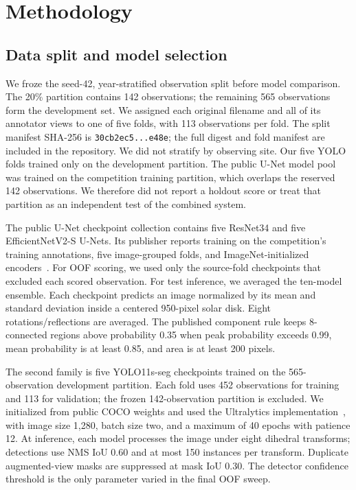 \documentclass[sigconf]{acmart}
\begin{document}
\section{Methodology}\label{sec:methodology}
    \subsection{Data split and model selection}
We froze the seed-42, year-stratified observation split before model comparison. The 20\% partition contains 142 observations; the remaining 565 observations form the development set. We assigned each original filename and all of its annotator views to one of five folds, with 113 observations per fold. The split manifest SHA-256 is \texttt{30cb2ec5...e48e}; the full digest and fold manifest are included in the repository. We did not stratify by observing site. Our five YOLO folds trained only on the development partition. The public U-Net model pool was trained on the competition training partition, which overlaps the reserved 142 observations. We therefore did not report a holdout score or treat that partition as an independent test of the combined system.

The public U-Net checkpoint collection contains five ResNet34 and five EfficientNetV2-S U-Nets. Its publisher reports training on the competition's training annotations, five image-grouped folds, and ImageNet-initialized encoders~\cite{afshar2026}. For OOF scoring, we used only the source-fold checkpoints that excluded each scored observation. For test inference, we averaged the ten-model ensemble. Each checkpoint predicts an image normalized by its mean and standard deviation inside a centered 950-pixel solar disk. Eight rotations/reflections are averaged. The published component rule keeps 8-connected regions above probability 0.35 when peak probability exceeds 0.99, mean probability is at least 0.85, and area is at least 200 pixels.

The second family is five YOLO11s-seg checkpoints trained on the 565-observation development partition. Each fold uses 452 observations for training and 113 for validation; the frozen 142-observation partition is excluded. We initialized from public COCO weights and used the Ultralytics implementation~\cite{ultralytics2026}, with image size 1,280, batch size two, and a maximum of 40 epochs with patience 12. At inference, each model processes the image under eight dihedral transforms; detections use NMS IoU 0.60 and at most 150 instances per transform. Duplicate augmented-view masks are suppressed at mask IoU 0.30. The detector confidence threshold is the only parameter varied in the final OOF sweep.
\end{document}
